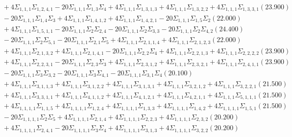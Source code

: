 \documentclass[12pt]{article}
\begin{document}
\begin{landscape}
\begin{align*}
		&\quad\quad +4\Sigma_{1,1,1}\Sigma_{1,2,4,1}-20\Sigma_{1,1,1}\Sigma_{1,3}\Sigma_{4}+4\Sigma_{1,1,1}\Sigma_{1,3,1,3}+4\Sigma_{1,1,1}\Sigma_{1,3,2,2}+4\Sigma_{1,1,1}\Sigma_{1,3,3,1}(23.900) \\ 
		&\quad\quad -20\Sigma_{1,1,1}\Sigma_{1,4}\Sigma_{3}+4\Sigma_{1,1,1}\Sigma_{1,4,1,2}+4\Sigma_{1,1,1}\Sigma_{1,4,2,1}-20\Sigma_{1,1,1}\Sigma_{1,5}\Sigma_{2}(22.000) \\ 
		&\quad\quad +4\Sigma_{1,1,1}\Sigma_{1,5,1,1}-20\Sigma_{1,1,1}\Sigma_{2}\Sigma_{2,4}-20\Sigma_{1,1,1}\Sigma_{2}\Sigma_{3,3}-20\Sigma_{1,1,1}\Sigma_{2}\Sigma_{4,2}(24.400) \\ 
		&\quad\quad -20\Sigma_{1,1,1}\Sigma_{2}\Sigma_{5,1}-20\Sigma_{1,1,1}\Sigma_{2,1}\Sigma_{5}+4\Sigma_{1,1,1}\Sigma_{2,1,1,4}+4\Sigma_{1,1,1}\Sigma_{2,1,2,3}(22.000) \\ 
		&\quad\quad +4\Sigma_{1,1,1}\Sigma_{2,1,3,2}+4\Sigma_{1,1,1}\Sigma_{2,1,4,1}-20\Sigma_{1,1,1}\Sigma_{2,2}\Sigma_{4}+4\Sigma_{1,1,1}\Sigma_{2,2,1,3}+4\Sigma_{1,1,1}\Sigma_{2,2,2,2}(23.900) \\ 
		&\quad\quad +4\Sigma_{1,1,1}\Sigma_{2,2,3,1}-20\Sigma_{1,1,1}\Sigma_{2,3}\Sigma_{3}+4\Sigma_{1,1,1}\Sigma_{2,3,1,2}+4\Sigma_{1,1,1}\Sigma_{2,3,2,1}+4\Sigma_{1,1,1}\Sigma_{2,4,1,1}(23.900) \\ 
		&\quad\quad -20\Sigma_{1,1,1}\Sigma_{3}\Sigma_{3,2}-20\Sigma_{1,1,1}\Sigma_{3}\Sigma_{4,1}-20\Sigma_{1,1,1}\Sigma_{3,1}\Sigma_{4}(20.100) \\ 
		&\quad\quad +4\Sigma_{1,1,1}\Sigma_{3,1,1,3}+4\Sigma_{1,1,1}\Sigma_{3,1,2,2}+4\Sigma_{1,1,1}\Sigma_{3,1,3,1}+4\Sigma_{1,1,1}\Sigma_{3,2,1,2}+4\Sigma_{1,1,1}\Sigma_{3,2,2,1}(21.500) \\ 
		&\quad\quad +4\Sigma_{1,1,1}\Sigma_{3,3,1,1}+4\Sigma_{1,1,1}\Sigma_{4,1,1,2}+4\Sigma_{1,1,1}\Sigma_{4,1,2,1}+4\Sigma_{1,1,1}\Sigma_{4,2,1,1}+4\Sigma_{1,1,1}\Sigma_{5,1,1,1}(21.500) \\ 
		&\quad\quad +4\Sigma_{1,1,1,1}\Sigma_{1,1,5}+4\Sigma_{1,1,1,1}\Sigma_{1,2,4}+4\Sigma_{1,1,1,1}\Sigma_{1,3,3}+4\Sigma_{1,1,1,1}\Sigma_{1,4,2}+4\Sigma_{1,1,1,1}\Sigma_{1,5,1}(21.500) \\ 
		&\quad\quad -20\Sigma_{1,1,1,1}\Sigma_{2}\Sigma_{5}+4\Sigma_{1,1,1,1}\Sigma_{2,1,4}+4\Sigma_{1,1,1,1}\Sigma_{2,2,3}+4\Sigma_{1,1,1,1}\Sigma_{2,3,2}(20.200) \\ 
		&\quad\quad +4\Sigma_{1,1,1,1}\Sigma_{2,4,1}-20\Sigma_{1,1,1,1}\Sigma_{3}\Sigma_{4}+4\Sigma_{1,1,1,1}\Sigma_{3,1,3}+4\Sigma_{1,1,1,1}\Sigma_{3,2,2}(20.200) \\ 

\end{align*}
\end{landscape}
\end{document}
